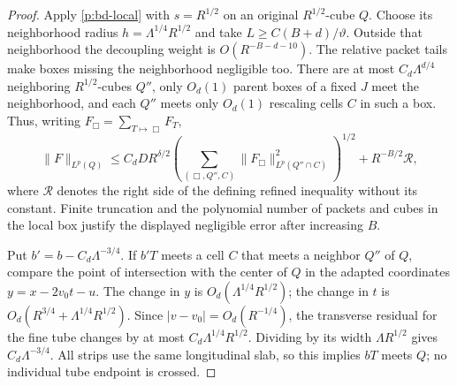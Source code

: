 \begin{proof}
Apply \eqref{p:bd-local} with $s=R^{1/2}$ on an original
$R^{1/2}$-cube $Q$.  Choose its neighborhood radius
$h=\Lambda^{1/4}R^{1/2}$ and take
$L\geq C(B+d)/\vartheta$.  Outside that neighborhood the decoupling
weight is $O(R^{-B-d-10})$.  The relative packet tails make boxes missing
the neighborhood negligible too.  There are at most
$C_d\Lambda^{d/4}$ neighboring $R^{1/2}$-cubes $Q''$, only $O_d(1)$
parent boxes of a fixed $J$ meet the neighborhood, and each $Q''$ meets
only $O_d(1)$ rescaling cells $C$ in such a box.  Thus, writing
$F_\Box=\sum_{T\mapsto\Box}F_T$,
\begin{equation}\label{p:expanded-decoupling}
 \|F\|_{L^p(Q)}\leq C_dD R^{\delta/2}
 \left(\sum_{(\Box,Q'',C)}
       \|F_\Box\|_{L^p(Q''\cap C)}^2\right)^{1/2}
       +R^{-B/2}\mathcal R,
\end{equation}
where $\mathcal R$ denotes the right side of the defining refined
inequality without its constant.  Finite truncation and the polynomial
number of packets and cubes in the local box justify the displayed
negligible error after increasing $B$.

Put $b'=b-C_d\Lambda^{-3/4}$.  If $b'T$ meets a cell $C$ that meets a
neighbor $Q''$ of $Q$, compare the point of intersection with the center
of $Q$ in the adapted coordinates $y=x-2v_0t-u$.  The change in $y$ is
$O_d(\Lambda^{1/4}R^{1/2})$; the change in $t$ is
$O_d(R^{3/4}+\Lambda^{1/4}R^{1/2})$.  Since
$|v-v_0|=O_d(R^{-1/4})$, the transverse residual for the fine tube
changes by at most $C_d\Lambda^{1/4}R^{1/2}$.  Dividing by its width
$\Lambda R^{1/2}$ gives $C_d\Lambda^{-3/4}$.  All strips use the same
longitudinal slab, so this implies $bT$ meets $Q$; no individual tube
endpoint is crossed.


\end{proof}

